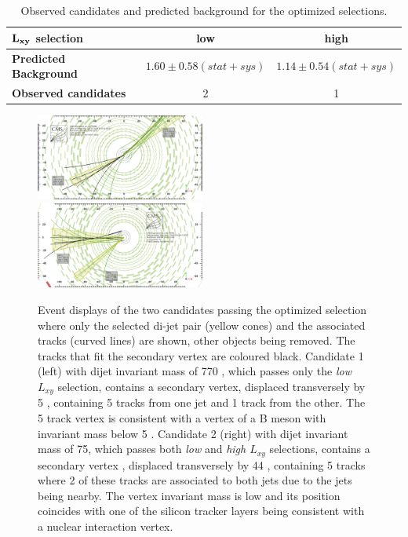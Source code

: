 \begin{table}[htbp]
\centering
\begin{tabular}{|l|c|c|}
\hline
$\bf L_{xy}$ \bf selection & \bf low & \bf high \\
\hline
\bf Predicted Background & $ 1.60\pm0.58(stat+sys)$ & $ 1.14\pm0.54(stat+sys)$ \\
\hline
\bf Observed candidates & 2 & 1 \\ 
\hline
\end{tabular}
\caption{Observed candidates and predicted background for the optimized selections.\label{tab:fullunblinding}}
\end{table}

\begin{figure}
\centering
\includegraphics[width=0.495\textwidth]{plots/displays/candidate1_display.png}
\includegraphics[width=0.495\textwidth]{plots/displays/candidate2_display.png}

\caption{Event displays of the two candidates passing the optimized selection where only the selected di-jet pair
 (yellow cones) and 
the associated tracks (curved lines) are shown, other objects being removed. The tracks that fit the secondary 
vertex are coloured black.  
Candidate 1 (left) with dijet invariant mass of 770 \GeV, which 
passes only the {\it low $L_{xy}$} selection, 
contains a secondary vertex, displaced transversely by 5 \cm, containing 5 tracks from one jet and 1 track
from the other. The 5 track vertex is consistent with a vertex of a B meson with invariant mass below 5 \GeV.
Candidate 2 (right) with dijet invariant mass of 75\GeV, 
which passes both {\it low} and {\it high $L_{xy}$} selections, contains a secondary vertex
, displaced transversely by 44 \cm, containing 5 tracks where 2 of these tracks are
associated to both jets due to the jets being nearby. The vertex invariant mass is low and its position
 coincides with one of the silicon 
tracker layers being consistent with a nuclear interaction vertex. \label{fig:eventDisplays}}
\end{figure} 



